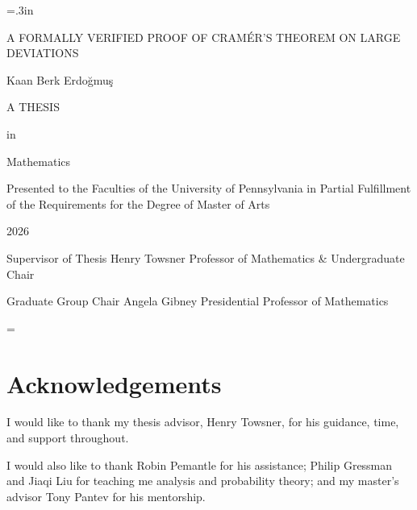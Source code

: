 \documentclass{article}
\begin{document}

\def\thetitle{A FORMALLY VERIFIED PROOF OF CRAM\'ER'S THEOREM ON LARGE DEVIATIONS}
\def\theauthor{Kaan Berk Erdo\u{g}mu\c{s}}
\def\theyear{2026}

\begin{titlepage}
  \large\newlength{\oldparskip}\setlength\oldparskip{\parskip}\parskip=.3in
  \thispagestyle{empty} \doublespacing
  \begin{center}
    \vspace*{\fill} \thetitle

    \theauthor

    A THESIS

    in

    Mathematics

    \large Presented to the Faculties of the University of
    Pennsylvania in Partial
    Fulfillment of the Requirements for the Degree of Master of
    Arts

    \large
    \theyear
  \end{center}

  \noindent\makebox[0in][l]{\rule[2ex]{3in}{.3mm}}
  Supervisor of Thesis\newline
  Henry Towsner\newline
  Professor of Mathematics \& Undergraduate Chair

  \noindent\makebox[0in][l]{\rule[2ex]{3in}{.3mm}}
  Graduate Group Chair\newline
  Angela Gibney\newline
  Presidential Professor of Mathematics
  \vspace*{\fill}

  \normalsize\parskip=\oldparskip
\end{titlepage}

\newpage
\setcounter{page}{2}

\section*{Acknowledgements}

I would like to thank my thesis advisor, Henry Towsner, for his guidance, time, and support
throughout.

I would also like to thank Robin Pemantle for his assistance;
Philip Gressman and Jiaqi Liu for teaching me analysis and probability theory;
and my master's advisor Tony Pantev for his mentorship.
\end{document}
